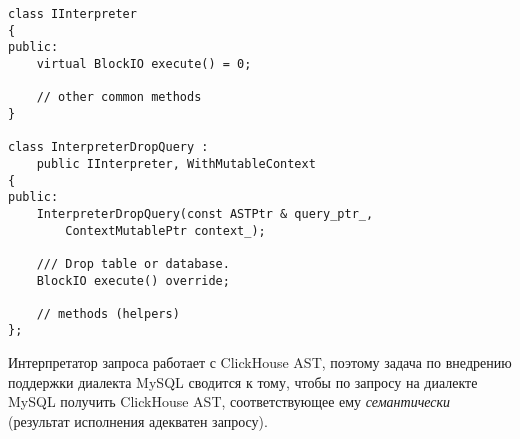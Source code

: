 \pagebreak

\begin{lstlisting}[style=customcpp, label={ch:IInterpreter_cpp}, caption={Интерфейс интерпретатора и пример его наследника}, captionpos=b]
class IInterpreter
{
public:
    virtual BlockIO execute() = 0;
    
    // other common methods
}

class InterpreterDropQuery : 
    public IInterpreter, WithMutableContext
{
public:
    InterpreterDropQuery(const ASTPtr & query_ptr_, 
        ContextMutablePtr context_);
    
    /// Drop table or database.
    BlockIO execute() override;

    // methods (helpers)
};
\end{lstlisting}

Интерпретатор запроса работает с ClickHouse AST, поэтому задача по внедрению поддержки диалекта MySQL сводится к тому, чтобы по запросу на диалекте MySQL получить ClickHouse AST, соответствующее ему \textit{семантически} (результат исполнения адекватен запросу).

\pagebreak
